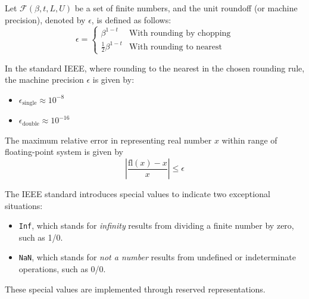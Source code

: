 \documentclass{article}
\begin{document}
\begin{definition}
    Let $\mathcal{F}(\beta,t,L,U)$ be a set of finite numbers, and the unit
    roundoff (or machine precision), denoted by $\epsilon$, is defined as
    follows:
    $$
    \epsilon=\begin{cases}
        \beta^{1-t} & \text{With rounding by chopping}\\ 
        \frac{1}{2}\beta^{1-t} & \text{With rounding to nearest}
    \end{cases}
    $$
\end{definition}
In the standard IEEE, where rounding to the nearest in the chosen rounding
rule, the machine precision $\epsilon$ is given by:
\begin{itemize}
    \item $\epsilon_{\text{single}}\approx10^{-8}$
    \item $\epsilon_{\text{double}}\approx10^{-16}$
\end{itemize}
\begin{theorem}
    The maximum relative error in representing real number $x$ within range of
    floating-point system is given by
    $$\left\lvert \frac{\text{fl}(x)-x}{x} \right\rvert\leq\epsilon$$
\end{theorem}
The IEEE standard introduces special values to indicate two exceptional
situations:
\begin{itemize}
    \item \texttt{Inf}, which stands for \textit{infinity} results from
        dividing a finite number by zero, such as 1/0.
    \item \texttt{NaN}, which stands for \textit{not a number} results from
        undefined or indeterminate operations, such as 0/0.
\end{itemize}
These special values are implemented through reserved representations.
\end{document}
